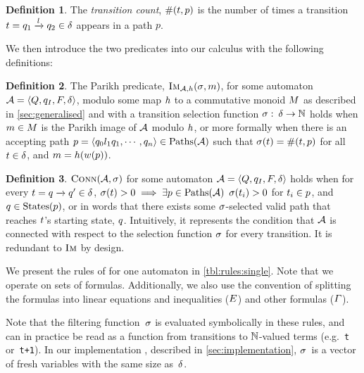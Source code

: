 \documentclass[acmsmall,review,anonymous,screen]{acmart}\settopmatter{printfolios=true,printccs=false,printacmref=true}
\theoremstyle{definition}
\newtheorem{definition}{Definition}[section]
\begin{document}
\begin{definition}
 The \textit{transition count}, $\operatorname{\#}(t, p)$ is the
 number of times a transition $t =
 q_1 \xrightarrow{l} q_2 \in \delta$ appears in a path
 $p$.
\end{definition}

We then introduce the two predicates into our calculus with the following
definitions:

\begin{definition}\label{def:single-image}
  The Parikh predicate, $\operatorname{\textsc{Im}}_{\mathcal{A}, h}(\operatorname{\sigma}, m)$, for some automaton
  $\mathcal{A} = \left\langle Q, q_I, F, \delta\right\rangle$, modulo some map $h$ to a
  commutative monoid $M$ as described in \cref{sec:generalised}
  and with a transition selection function
  $\operatorname{\sigma}:\: \delta \to \mathbb{N}$ holds when
  $m \in M$ is the Parikh image of $\mathcal{A}$
  modulo $h$, or more formally when there is an accepting path
  $p = \left\langle q_0 l_1 q_1 , \cdots , q_n\right\rangle \in \operatorname{Paths}(\mathcal{A})$ such
  that $\operatorname{\sigma}(t) = \operatorname{\#}(t, p)$
  for all $t \in \delta$, and $m = h(w(p))$.
\end{definition}

\begin{definition}
  $\operatorname{\textsc{Conn}}(\mathcal{A}, \operatorname{\sigma})$ for some automaton $\mathcal{A} =
  \left\langle Q, q_I, F, \delta\right\rangle$ holds when for every $t =
  q \xrightarrow{} q' \in \delta$, $\operatorname{\sigma}(t) > 0
  \implies \exists p \in \operatorname{Paths}(\mathcal{A})$ $\operatorname{\sigma}(t_i) > 0$
  for $t_i \in p$, and $q \in \operatorname{States}(p)$, or in words that
  there exists some $\operatorname{\sigma}$-selected valid path that reaches $t$'s
  starting state, $q$. Intuitively, it represents the condition that
  $\mathcal{A}$ is connected with respect to the selection function $\operatorname{\sigma}$ for
  every transition. It is redundant to $\operatorname{\textsc{Im}}$ by design.
\end{definition}

We present the rules of \Calculus{} for one automaton in
\cref{tbl:rules:single}. Note that we operate on sets of
formulas. Additionally, we also use the convention of splitting the
formulas into linear equations and inequalities ($E$)
and other formulas ($\varGamma$). 

Note that the filtering function~$\operatorname{\sigma}$ is evaluated symbolically in these
rules, and can in practice be read as a function from transitions to
$\mathbb{N}$-valued terms (e.g.~\texttt{t} or~\texttt{t+1}). In our implementation \Catra{},
described in \cref{sec:implementation}, $\operatorname{\sigma}$~is a vector of fresh variables
with the same size as~$\delta$.
\end{document}
